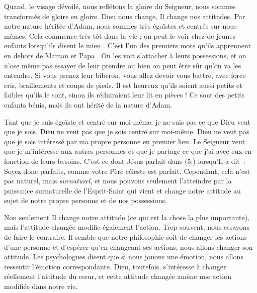 \begin{specialpar}{}
Quand, le visage dévoilé, nous reflétons la gloire du Seigneur,
 nous sommes transformés de gloire en gloire.
 Dieu nous change, Il change nos attitudes.
 Par notre nature héritée d'Adam, nous sommes très égoïstes
 et centrés sur nous-mêmes.
 Cela commence très tôt dans la vie ; on peut le voir chez de jeunes enfants
 lorsqu'ils disent \og le mien \fg{}.
 C'est l'un des premiers mots qu'ils apprennent
 en dehors de \og Maman \fg{} et \og Papa \fg{}.
 On les voit s'attacher à leurs possessions, et on n'ose même pas
 essayer de leur prendre ou bien on peut être sûr qu'on va les entendre.
 Si vous prenez leur biberon, vous allez devoir vous battre,
 avec force cris, braillements et coups de pieds.
 Il est heureux qu'ils soient aussi petits et faibles qu'ils le sont,
 sinon ils réduiraient leur lit en pièces !
 Ce sont des petits enfants bénis,
 mais ils ont hérité de la nature d'Adam.
\end{specialpar}

Tant que je suis égoïste et centré sur moi-même,
 je ne suis pas ce que Dieu veut que je sois.
 Dieu ne veut pas que je sois centré sur moi-même.
 Dieu ne veut pas que je sois intéressé par ma propre personne
 en premier lieu.
 Le Seigneur veut que je m'intéresse aux autres personnes et que
 je partage ce que j'ai avec eux en fonction de leurs besoins.
 C'est ce dont Jésus parlait dans (5:) lorsqu'Il a dit~:
 \og Soyez donc parfaits, comme votre Père céleste est parfait. \fg{}
 Cependant, cela n'est pas naturel, mais \emph{surnaturel},
 et nous pouvons seulement
 l'atteindre par la puissance surnaturelle de l'Esprit-Saint
 qui vient et change notre attitude au sujet de notre propre personne
 et de nos possessions.

\begin{specialpar}{}
Non seulement Il change notre attitude (ce qui est la chose la plus importante),
 mais l'attitude changée modifie également l'action.
 Trop souvent, nous essayons de faire le contraire.
 Il semble que notre philosophie soit de changer les actions d'une personne
 et d'espérer qu'en changeant ses actions, nous allons changer son attitude.
 Les psychologues disent que si nous jouons une émotion, nous allons ressentir
 l'émotion correspondante.
 Dieu, toutefois, s'intéresse à changer réellement l'attitude du cœur,
 et cette attitude changée amène une action modifiée dans notre vie.
\end{specialpar}


